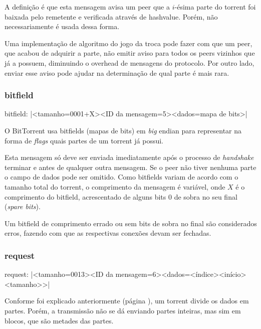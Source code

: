 A definição é que esta mensagem avisa um \gls*{peer} que a $i$-ésima parte do
\gls*{torrent} foi baixada pelo remetente e verificada através de \gls*{hashvalue}.
Porém, não necessariamente é usada dessa forma.


Uma implementação de algoritmo do jogo da troca pode fazer com que um \gls*{peer}, que
acabou de adquirir a parte, não emitir aviso para todos os \gls*{peers} vizinhos que já
a possuem, diminuindo o \gls{overhead} de mensagens do protocolo. Por outro lado, enviar
esse aviso pode ajudar na determinação de qual parte é mais rara.

\subsubsection*{bitfield}

bitfield: \bverb|<tamanho=0001+X><ID da mensagem=5><dados=mapa de bits>|

O BitTorrent usa bitfields (mapas de bits) em \emph{big} \gls*{endian} para representar
na forma de \emph{flags} quais partes de um \gls*{torrent} já possui.

Esta mensagem só deve ser enviada imediatamente após o processo de \emph{handshake}
terminar e antes de qualquer outra mensagem. Se o \gls*{peer} não tiver nenhuma parte o
campo de dados pode ser omitido. Como bitfields variam de acordo com o tamanho total do
\gls*{torrent}, o comprimento da mensagem é variável, onde $X$ é o comprimento do
bitfield, acrescentado de alguns bits 0 de sobra no seu final (\emph{spare bits}).

Um bitfield de comprimento errado ou sem bits de sobra no final são considerados erros,
fazendo com que as respectivas conexões devam ser fechadas.


\subsubsection*{request}

request: \bverb|<tamanho=0013><ID da mensagem=6><dados=<índice><início><tamanho>>|

Conforme foi explicado anteriormente (página \pageref{subsec:partes}), um
\gls*{torrent} divide os dados em partes. Porém, a transmissão não se dá enviando
partes inteiras, mas sim em blocos, que são metades das partes.

